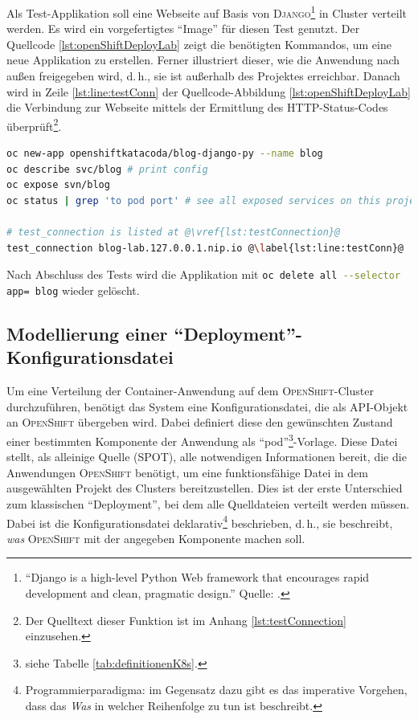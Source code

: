 \par
Als Test-Applikation soll eine Webseite auf Basis von \textsc{Django}\footnote{\enquote{Django is a high-level Python Web framework that encourages rapid development and clean, pragmatic design.} Quelle: \cite[][]{django_software_foundation_web_2020}.} in Cluster verteilt werden. Es wird ein vorgefertigtes \enquote{Image} für diesen Test genutzt. Der Quellcode \vref{lst:openShiftDeployLab} zeigt die benötigten Kommandos, um eine neue Applikation zu erstellen. Ferner illustriert dieser, wie die Anwendung nach außen freigegeben wird, d.\,h., sie ist außerhalb des Projektes erreichbar. Danach wird in Zeile \vref{lst:line:testConn} der Quellcode-Abbildung \vref{lst:openShiftDeployLab} die Verbindung zur Webseite mittels der Ermittlung des \textsc{HTTP}-Status-Codes überprüft\footnote{Der Quelltext dieser Funktion ist im Anhang \vref{lst:testConnection} einzusehen.}.

\begin{lstlisting}[language=bash, caption={Test-\enquote{Deployment} ins \textsc{OpenShift}-Cluster}, label={lst:openShiftDeployLab}]
oc new-app openshiftkatacoda/blog-django-py --name blog
oc describe svc/blog # print config 
oc expose svn/blog
oc status | grep 'to pod port' # see all exposed services on this project

# test_connection is listed at @\vref{lst:testConnection}@
test_connection blog-lab.127.0.0.1.nip.io @\label{lst:line:testConn}@
\end{lstlisting}

Nach Abschluss des Tests wird die Applikation mit \lstinline[language=bash]|oc delete all --selector app= blog| wieder gelöscht.

\subsection{Modellierung einer \enquote{Deployment}-Konfigurationsdatei}
Um eine Verteilung der Container-Anwendung auf dem \textsc{OpenShift}-Cluster durchzuführen, benötigt das System eine Konfigurationsdatei, die als \ac{API}-Objekt an \textsc{OpenShift} übergeben wird. Dabei definiert diese den gewünschten Zustand einer bestimmten Komponente der Anwendung als \enquote{pod}\footnote{siehe Tabelle \vref{tab:definitionenK8s}.}-Vorlage.\autocite[vgl.][Application\,$\rightarrow$\,Deployments]{red_hat_inc_okd_2019} Diese Datei stellt, als alleinige Quelle (\ac{SPOT}), alle notwendigen Informationen bereit, die die Anwendungen \textsc{OpenShift} benötigt, um eine funktionsfähige Datei in dem ausgewählten Projekt des Clusters bereitzustellen. Dies ist der erste Unterschied zum klassischen \enquote{Deployment}, bei dem alle Quelldateien verteilt werden müssen.\autocite[vgl.][]{dearle_software_2007} Dabei ist die Konfigurationsdatei deklarativ\footnote{Programmierparadigma: im Gegensatz dazu gibt es das imperative Vorgehen, dass das \textit{Was} in welcher Reihenfolge zu tun ist beschreibt.} beschrieben, d.\,h., sie beschreibt, \textit{was} \textsc{OpenShift} mit der angegeben Komponente machen soll.

